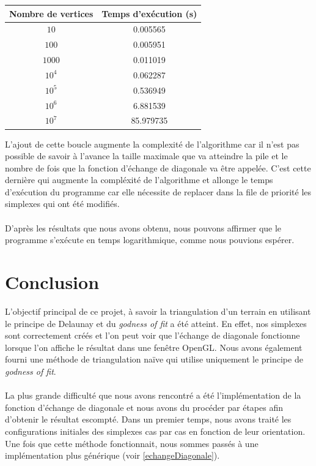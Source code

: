\documentclass{article}
\begin{document}
        \begin{center}
            \begin{tabular}{|c|c|}\hline \label{tempsDelaunay}
                Nombre de vertices & Temps d'exécution (s) \\
                \hline
                $10$ &  0.005565 \\
                $100$ & 0.005951 \\
                $1000$ & 0.011019 \\
                $10^4$ & 0.062287 \\
                $10^5$ & 0.536949 \\
                $10^6$ & 6.881539 \\
                $10^7$ & 85.979735 \\
                \hline
            \end{tabular}
        \end{center}
        
        L'ajout de cette boucle augmente la complexité de l'algorithme car il n'est pas possible de savoir à l'avance la taille maximale que va atteindre la pile et le nombre de fois que la fonction d'échange de diagonale va être appelée. C'est cette dernière qui augmente la compléxité de l'algorithme et allonge le temps d'exécution du programme car elle nécessite de replacer dans la file de priorité les simplexes qui ont été modifiés. 
        \paragraph{}
        D'après les résultats que nous avons obtenu, nous pouvons affirmer que le programme s'exécute en temps logarithmique, comme nous pouvions espérer.


\section{Conclusion}    

    L'objectif principal de ce projet, à savoir la triangulation d'un terrain en utilisant le principe de Delaunay et du \textit{godness of fit} a été atteint. En effet, nos simplexes sont correctement créés et l'on peut voir que l'échange de diagonale fonctionne lorsque l'on affiche le résultat dans une fenêtre OpenGL. Nous avons également fourni une méthode de triangulation naïve qui utilise uniquement le principe de \textit{godness of fit}.
    
    \paragraph{}
    La plus grande difficulté que nous avons rencontré a été l'implémentation de la fonction d'échange de diagonale et nous avons du procéder par étapes afin d'obtenir le résultat escompté. Dans un premier temps, nous avons traité les configurations initiales des simplexes cas par cas en fonction de leur orientation. Une fois que cette méthode fonctionnait, nous sommes passés à une implémentation plus générique (voir \ref{echangeDiagonale}).
\end{document}
